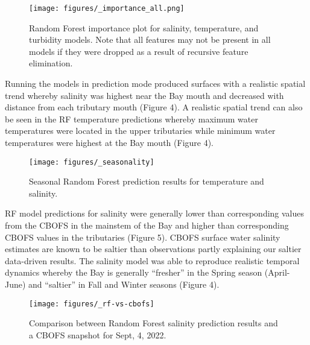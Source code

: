 \documentclass{article}
\begin{document}
\begin{figure}[ht!]
    \begin{center}
          \texttt{[image: figures/\_importance\_all.png]}
          \caption{Random Forest importance plot for salinity, temperature, and turbidity models. Note that all features may not be present in all models if they were dropped as a result of recursive feature elimination.}
    \end{center}    
\end{figure}

Running the models in prediction mode produced surfaces with a realistic spatial trend whereby salinity was highest near the Bay mouth and decreased with distance from each tributary mouth (Figure 4). A realistic spatial trend can also be seen in the RF temperature predictions whereby maximum water temperatures were located in the upper tributaries while minimum water temperatures were highest at the Bay mouth (Figure 4).

\begin{figure}[ht!]
    \begin{center}
          \texttt{[image: figures/\_seasonality]}
          \caption{Seasonal Random Forest prediction results for temperature and salinity.}
    \end{center}    
\end{figure}

RF model predictions for salinity were generally lower than corresponding values from the CBOFS in the mainstem of the Bay and higher than corresponding CBOFS values in the tributaries (Figure 5). CBOFS surface water salinity estimates are known to be saltier than observations \cite{lanerolle2011second, vogelAssessingSatelliteSea2016} partly explaining our saltier data-driven results. The salinity model was able to reproduce realistic temporal dynamics whereby the Bay is generally “fresher” in the Spring season (April-June) and “saltier” in Fall and Winter seasons (Figure 4).

\begin{figure}[ht!]
    \begin{center}
          \texttt{[image: figures/\_rf-vs-cbofs]}
          \caption{Comparison between Random Forest salinity prediction results and a CBOFS snapshot for Sept, 4, 2022.}
    \end{center}    
\end{figure}
\end{document}
